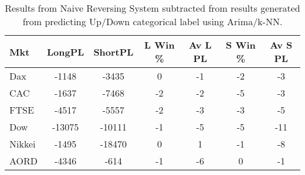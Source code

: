 \begin{table}[ht]
\centering
\caption[Predicting UpDn CAT - Arima/k-NN predictions passed to System 4 - ]{Results from Naive Reversing System subtracted from results generated from predicting Up/Down categorical label using Arima/k-NN.} 
\label{tab:chp_ts:pUD_CAT_arima_knn_sys_diff}
\begin{tabular}{lcccccc}
  \toprule Mkt & LongPL & ShortPL & L Win \% & Av L PL & S Win \% & Av S PL \\ 
  \midrule Dax & -1148 & -3435 & 0 & -1 & -2 & -3 \\ 
  CAC & -1637 & -7468 & -2 & -2 & -5 & -3 \\ 
  FTSE & -4517 & -5557 & -2 & -3 & -3 & -5 \\ 
  Dow & -13075 & -10111 & -1 & -5 & -5 & -11 \\ 
  Nikkei & -1495 & -18470 & 0 & 1 & -1 & -8 \\ 
  AORD & -4346 & -614 & -1 & -6 & 0 & -1 \\ 
   \bottomrule \end{tabular}
\end{table}
